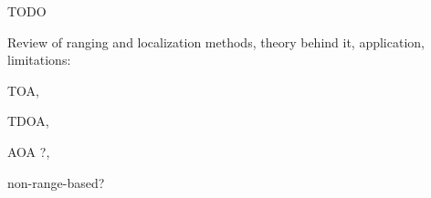 \label{chapter:problem}

TODO

Review of ranging and localization methods, theory behind it, application, limitations: 

TOA,
 
TDOA,

AOA ?,

non-range-based? 
%
%
%
%
%
%
%
